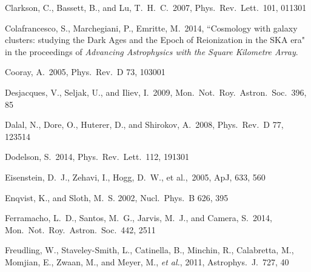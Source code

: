 \begin{thebibliography}{99}
\begin{multicols}{2}
{ 
  Clarkson, C., Bassett, B., and Lu, T.~H.~C.\ 2007,
  Phys.\ Rev.\ Lett.\ 101, 011301

  Colafrancesco, S., Marchegiani, P., Emritte, M.\ 2014,
  ``Cosmology with galaxy clusters: studying the Dark Ages and the Epoch of Reionization in the SKA era" 
in the proceedings of {\it Advancing Astrophysics with the Square Kilometre Array}.

  Cooray, A.\ 2005,
  Phys.\ Rev.\ D 73, 103001
  

  Desjacques, V., Seljak, U., and Iliev, I.\ 2009,
  Mon.\ Not.\ Roy.\ Astron.\ Soc.\  396, 85

  Dalal, N., Dore, O., Huterer, D., and Shirokov, A.\ 2008,
  Phys.\ Rev.\ D 77, 123514

  Dodelson, S.\ 2014,
  Phys.\ Rev.\ Lett.\ 112, 191301


 Eisenstein, D.~J., 
Zehavi, I., Hogg, D.~W., et al.,\ 2005, ApJ, 633, 560

  Enqvist, K., and Sloth, M.~S. 2002,
  Nucl.\ Phys.\ B 626, 395


  Ferramacho, L.~D., Santos, M.~G., Jarvis, M.~J., and Camera, S.\ 2014,
  Mon.\ Not.\ Roy.\ Astron.\ Soc.\ 442, 2511

  Freudling, W., Staveley-Smith, L., Catinella, B., Minchin, R., Calabretta, M., Momjian, E., Zwaan, M., and Meyer, M., {\it et al.}, 2011,
  Astrophys.\ J.\ 727, 40

}
\end{multicols}
\end{thebibliography}
